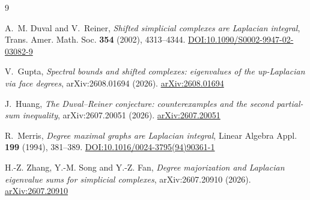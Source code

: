 \documentclass[11pt,reqno]{amsart}
\theoremstyle{plain}
\theoremstyle{definition}
\begin{document}
\begin{thebibliography}{9}

A.~M. Duval and V.~Reiner,
\emph{Shifted simplicial complexes are Laplacian integral},
Trans. Amer. Math. Soc. \textbf{354} (2002), 4313--4344.
\href{https://doi.org/10.1090/S0002-9947-02-03082-9}{DOI:10.1090/S0002-9947-02-03082-9}

V.~Gupta,
\emph{Spectral bounds and shifted complexes: eigenvalues of the up-Laplacian via face degrees},
arXiv:2608.01694 (2026). \href{https://arxiv.org/abs/2608.01694}{arXiv:2608.01694}

J.~Huang,
\emph{The Duval--Reiner conjecture: counterexamples and the second partial-sum inequality},
arXiv:2607.20051 (2026). \href{https://arxiv.org/abs/2607.20051}{arXiv:2607.20051}

R.~Merris,
\emph{Degree maximal graphs are Laplacian integral},
Linear Algebra Appl. \textbf{199} (1994), 381--389.
\href{https://doi.org/10.1016/0024-3795(94)90361-1}{DOI:10.1016/0024-3795(94)90361-1}

H.-Z. Zhang, Y.-M. Song and Y.-Z. Fan,
\emph{Degree majorization and Laplacian eigenvalue sums for simplicial complexes},
arXiv:2607.20910 (2026). \href{https://arxiv.org/abs/2607.20910}{arXiv:2607.20910}

\end{thebibliography}
\end{document}
